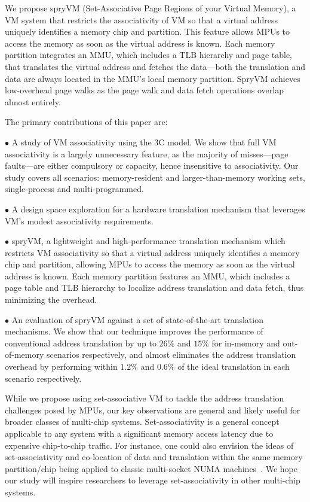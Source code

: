 We propose spryVM (Set-Associative Page Regions of your Virtual Memory), a VM system that restricts the associativity of VM so that a virtual address uniquely identifies a memory chip and partition. This feature allows MPUs to access the memory as soon as the virtual address is known. Each memory partition integrates an MMU, which includes a TLB hierarchy and page table, that translates the virtual address and fetches the data---both the translation and data are always located in the MMU's local memory partition. SpryVM achieves low-overhead page walks as the page walk and data fetch operations overlap almost entirely.

The primary contributions of this paper are:

\noindent $\bullet$ A study of VM associativity using the 3C model. We show that full VM associativity is a largely unnecessary feature, as the majority of misses---page faults---are either compulsory or capacity, hence insensitive to associativity. Our study covers all scenarios: memory-resident and larger-than-memory working sets, single-process and multi-programmed. 

\noindent $\bullet$ A design space exploration for a hardware translation mechanism that leverages VM's modest associativity requirements.

\noindent $\bullet$ spryVM, a lightweight and high-performance translation mechanism which restricts VM associativity so that a virtual address uniquely identifies a memory chip and partition, allowing MPUs to access the memory as soon as the virtual address is known. Each memory partition features an MMU, which includes a page table and TLB hierarchy to localize address translation and data fetch, thus minimizing the overhead. 

\noindent $\bullet$ An evaluation of spryVM against a set of state-of-the-art translation mechanisms. We show that our technique improves the performance of conventional address translation by up to $26\%$ and $15\%$ for in-memory and out-of-memory scenarios respectively, and almost eliminates the address translation overhead by performing within $1.2\%$ and $0.6\%$ of the ideal translation in each scenario respectively.


While we propose using set-associative VM to tackle the address translation challenges posed by MPUs, our key observations are general and likely useful for broader classes of multi-chip systems. Set-associativity is a general concept applicable to any system with  a significant memory access latency due to expensive chip-to-chip traffic. For instance, one could also envision the ideas of set-associativity and co-location of data and translation within the same memory partition/chip being applied to classic multi-socket NUMA machines~\cite{hp:hp, huawei:kunlun, ning:open}. We hope our study will inspire researchers to leverage set-associativity in other multi-chip systems.


